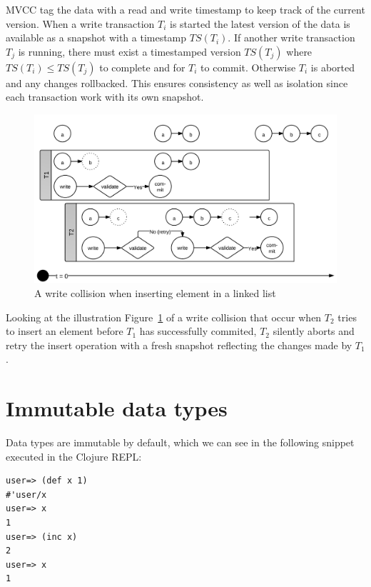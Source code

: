 \documentclass[a4paper,12pt]{kth-mag}
\begin{document}
MVCC tag the data with a read and write timestamp to keep track of the current version. When a write transaction $T_i$ is started the latest version of the data is available as a snapshot with a timestamp $TS(T_i)$. If another write transaction $T_j$ is running, there must exist a timestamped version $TS(T_j)$ where $TS(T_i) \le TS(T_j)$ to complete and for $T_i$ to commit. Otherwise $T_i$ is aborted and any changes rollbacked. This ensures consistency as well as isolation since each transaction work with its own snapshot.

\begin{figure}[H]
\centering
\includegraphics[scale=0.8]{images/TransactionWriteCollision.png}
\caption{A write collision when inserting element in a linked list}
\label{fig:twc}
\end{figure}

Looking at the illustration Figure~\ref{fig:twc} of a write collision that occur when $T_2$ tries to insert an element before $T_1$ has successfully commited, $T_2$ silently aborts and retry the insert operation with a fresh snapshot reflecting the changes made by $T_1$.

\section{Immutable data types}

Data types are immutable by default, which we can see in the following snippet executed in the Clojure REPL:

\begin{listing}[H]
	\begin{verbatim}
user=> (def x 1)
#'user/x
user=> x
1
user=> (inc x)
2
user=> x
1
	\end{verbatim}
\end{listing}
\end{document}
